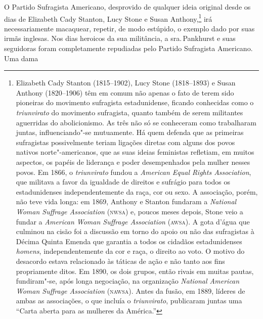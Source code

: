 O Partido Sufragista Americano, desprovido de qualquer ideia original
desde os dias de Elizabeth Cady Stanton, Lucy Stone e Susan
Anthony,\footnote{Elizabeth Cady Stanton (1815--1902), Lucy Stone
  (1818--1893) e Susan Anthony (1820--1906) têm em comum não apenas o fato
  de terem sido pioneiras do movimento sufragista estadunidense, ficando
  conhecidas como o \textit{triunvirato} do movimento sufragista, quanto
  também de serem militantes aguerridas do abolicionismo. As três não só
  se conheceram como trabalharam juntas, influenciando"-se mutuamente. Há
  quem defenda que as primeiras sufragistas possivelmente teriam ligações diretas com
  alguns dos povos nativos norte"-americanos, que as suas ideias
  feministas refletiam, em muitos aspectos, os papéis de liderança e
  poder desempenhados pela mulher nesses povos. Em 1866, o
  \textit{triunvirato} fundou a \textit{American Equal Rights Association}, que
  militava a favor da igualdade de direitos e sufrágio para todos os
  estadunidenses independentemente da raça, cor ou sexo. A associação,
  porém, não teve vida longa: em 1869, Anthony e Stanton fundaram a
  \textit{National Woman Suffrage Association} (\textsc{nwsa}) e, poucos meses
  depois, Stone veio a fundar a \textit{American Woman Suffrage
  Association} (\textsc{awsa}). A gota d'água que culminou na cisão foi a
  discussão em torno do apoio ou não das sufragistas à Décima Quinta
  Emenda que garantia a todos os cidadãos estadunidenses \textit{homens},
  independentemente da cor e raça, o direito ao voto. O motivo do
  desacordo estava relacionado às táticas de ação e não tanto aos fins
  propriamente ditos. Em 1890, os dois grupos, então rivais em muitas
  pautas, fundiram"-se, após longa negociação, na organização
  \textit{National American Woman Suffrage Association} (\textsc{nawsa}).
  Antes da fusão, em 1889, líderes de ambas as associações, o que
  incluía o \textit{triunvirato}, publicaram juntas uma ``Carta aberta para
  as mulheres da América.''} irá necessariamente macaquear, repetir, de
modo estúpido, o exemplo dado por suas irmãs inglesas. Nos dias heroicos
da sua militância, a sra.\,Pankhurst e suas seguidoras foram
completamente repudiadas pelo Partido Sufragista Americano. Uma dama
